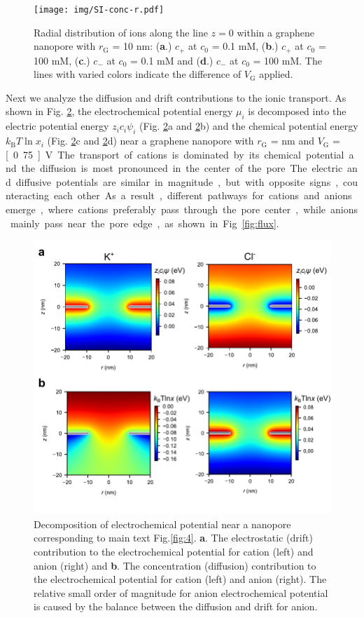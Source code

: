 \documentclass[journal=langd5,email=true, hyperref=true, keywords=false]{achemso}
\newcommand{\Fig}{Fig.}
\begin{document}
\begin{figure}[htbp]
  \centering
  \texttt{[image: img/SI-conc-r.pdf]}
  \caption{Radial distribution of ions along the line $z=0$ within a
    graphene nanopore with $r_{\mathrm{G}}$ = 10 nm: (\textbf{a}.)
    $c_{+}$ at $c_{0}$ = 0.1 mM, (\textbf{b}.) $c_{+}$ at $c_{0}$ =
    100 mM, (\textbf{c}.) $c_{-}$ at $c_{0}$ = 0.1 mM and
    (\textbf{d}.) $c_{-}$ at $c_{0}$ = 100 mM. The lines with varied
    colors indicate the difference of $V_{\mathrm{G}}$ applied.}
  \label{fig:conc-r}
\end{figure}

Next we analyze the diffusion and drift contributions to the ionic
transport. As shown in Fig. \ref{fig:potential}, the
electrochemical potential energy $\mu_{i}$ is decomposed into the
electric potential energy $z_{i} c_{i} \psi_{i}$ (Fig.
\ref{fig:potential}a and \ref{fig:potential}b) and the chemical
potential energy $k_{\mathrm{B}}T \ln x_{i}$ (Fig.
\ref{fig:potential}c and \ref{fig:potential}d) near a graphene
nanopore with $r_{\mathrm{G}}$ = \unit[10]{nm} and $V_{\mathrm{G}}$ = \unit[0.75]
{V}. The transport of cations is dominated by its chemical potential and
the diffusion is most pronounced in the center of the pore. The electric and diffusive potentials are similar in magnitude, but with
opposite signs, counteracting each other. As a result, different pathways for cations
and anions emerge, where cations preferably pass through the pore
center, while anions mainly pass near the pore edge, as shown in
Fig. \ref{fig:flux}.

\begin{figure}[htbp]
  \centering
  \includegraphics[width=0.8\linewidth]{img/SI-electrochemical-decomposite.pdf}
  \caption{Decomposition of electrochemical potential near a nanopore
    corresponding to main text \Fig \ref{fig:4}. \textbf{a}. The electrostatic
    (drift) contribution to the electrochemical potential for cation
    (left) and anion (right) and \textbf{b}. The concentration (diffusion)
    contribution to the electrochemical potential for cation (left)
    and anion (right). The relative small order of magnitude for anion
    electrochemical potential is caused by the balance between the
    diffusion and drift for anion.}
  \label{fig:potential}
\end{figure}
\end{document}
